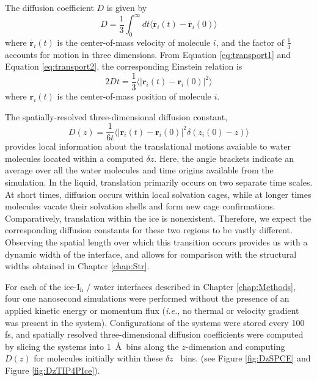 The diffusion coefficient $D$ is given by
\begin{equation}\label{eq:diffusion1}
D = \frac{1}{3} \int_0^{\infty} dt \langle \dot{\mathbf{r}_i}(t) -
\dot{\mathbf{r}_i}(0) \rangle
\end{equation}
where $\dot{\mathbf{r}_i}(t)$ is the center-of-mass velocity of molecule
$i$, and the factor of $\frac{1}{3}$ accounts for motion in three
dimensions. From Equation \eqref{eq:transport1} and Equation \eqref{eq:transport2},
the corresponding Einstein relation is
\begin{equation}\label{eq:diffusion2}
2Dt = \frac{1}{3} \langle | \mathbf{r}_i(t) - \mathbf{r}_i(0) |^2 \rangle
\end{equation}
where $\mathbf{r}_i(t)$ is the center-of-mass position of molecule
$i$. 

The spatially-resolved three-dimensional diffusion constant,
\begin{equation}\label{eq:diffusion3}
D(z) = \frac{1}{6t} \langle | \mathbf{r}_i(t) - \mathbf{r}_i(0) |^2
\delta(z_i(0) - z)  \rangle 
\end{equation}
provides local information about the translational motions avaiable to
water molecules located within a computed $\delta z$. Here, the
angle brackets indicate an average over all the water molecules and
time origins available from the simulation. In the liquid, translation
primarily occurs on two separate time scales. At short times,
diffusion occurs within local solvation cages, while at longer times
molecules vacate their solvation shells and form new cage
confirmations. Comparatively, translation within the ice is
nonexistent. Therefore, we expect the corresponding diffusion
constants for these two regions to be vastly different. Observing the
spatial length over which this transition occurs provides us with a
dynamic width of the interface, and allows for comparison with the
structural widths obtained in Chapter \ref{chap:Str}.

For each of the ice-I$_\mathrm{h}$ / water interfaces described in
Chapter \ref{chap:Methods}, four one nanosecond simulations were
performed without the presence of an applied kinetic energy or
momentum flux (\textit{i.e.}, no thermal or velocity gradient was
present in the system). Configurations of the systems were stored
every 100 fs, and spatially resolved three-dimensional diffusion
coefficients were computed by slicing the systems into 1~\AA~bins
along the $z$-dimension and computing $D(z)$ for molecules initially
within these $\delta z$~ bins. (see Figure \ref{fig:DzSPCE} and Figure
\ref{fig:DzTIP4PIce}).

